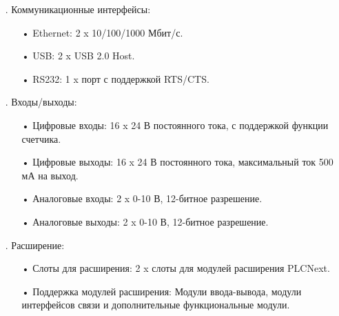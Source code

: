 {\begin{itemize}[leftmargin=2.15cm, labelwidth=0.65cm, labelsep=0.0cm]
\begin{itemize}[leftmargin=1.5cm, labelwidth=0.65cm, labelsep=0.0cm]
			\item[•] Встроенная память: 1 ГБ RAM, 4 ГБ eMMC.
			
		\end{itemize}
		
		\addtocounter{itemcntr}{1}
		
		\item[\theitemcntr. ] Коммуникационные интерфейсы:
		
		\begin{itemize}[leftmargin=1.5cm, labelwidth=0.65cm, labelsep=0.0cm] 
			
			\item[•] Ethernet: 2 x 10/100/1000 Мбит/с.
			
			\item[•] USB: 2 x USB 2.0 Host.
			
			\item[•] RS232: 1 x порт с поддержкой RTS/CTS.
			
		\end{itemize}
		
		\addtocounter{itemcntr}{1}
		
		\item[\theitemcntr. ] Входы/выходы:
		
			\begin{itemize}[leftmargin=1.5cm, labelwidth=0.65cm, labelsep=0.0cm] 
			
			\item[•]	Цифровые входы: 16 x 24 В постоянного тока, с поддержкой функции счетчика.
			\item[•]	Цифровые выходы: 16 x 24 В постоянного тока, максимальный ток 500 мА на выход.
			\item[•]	Аналоговые входы: 2 x 0-10 В, 12-битное разрешение.
			\item[•]	Аналоговые выходы: 2 x 0-10 В, 12-битное разрешение.
			
		\end{itemize}
		
		\addtocounter{itemcntr}{1}
		
		\item[\theitemcntr. ] Расширение:
		
		\begin{itemize}[leftmargin=1.5cm, labelwidth=0.65cm, labelsep=0.0cm] 
				
				\item[•]	Слоты для расширения: 2 x слоты для модулей расширения PLCNext.
				
				\item[•]	Поддержка модулей расширения: Модули ввода-вывода, модули интерфейсов связи и дополнительные функциональные модули.
			

\end{itemize}
\end{itemize}}
